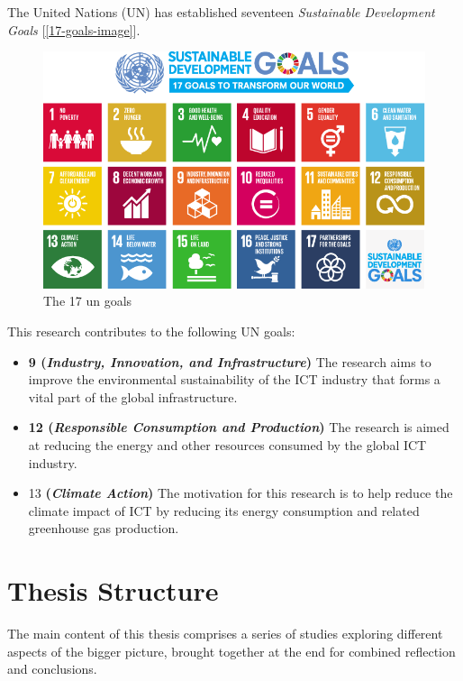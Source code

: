 The United Nations (UN) has established seventeen \emph{Sustainable Development Goals} [\autoref{17-goals-image}].

\begin{figure}[ht!]
\centering
\includegraphics[width=\textwidth]{Figures/17goals.png}
\caption{\label{17-goals-image}The 17 \gls{un goals} \citep{UnitedNations2015}}
\end{figure}

This research contributes to the following UN goals:

\begin{itemize}
    \item \textbf{9 (\emph{Industry, Innovation, and Infrastructure})} The research aims to improve the environmental sustainability of the \gls{ICT} industry that forms a vital part of the global infrastructure.
    \item \textbf{12 (\emph{Responsible Consumption and Production})} The research is aimed at reducing the energy and other resources consumed by the global \gls{ICT} industry.
    \item 13 \textbf{(\emph{Climate Action})} The motivation for this research is to help reduce the climate impact of \gls{ICT} by reducing its energy consumption and related greenhouse gas production.
\end{itemize}

\newpage
\section{Thesis Structure}
\label{section:thesis structure}

The main content of this thesis comprises a series of studies exploring different aspects of the bigger picture, brought together at the end for combined reflection and conclusions.

